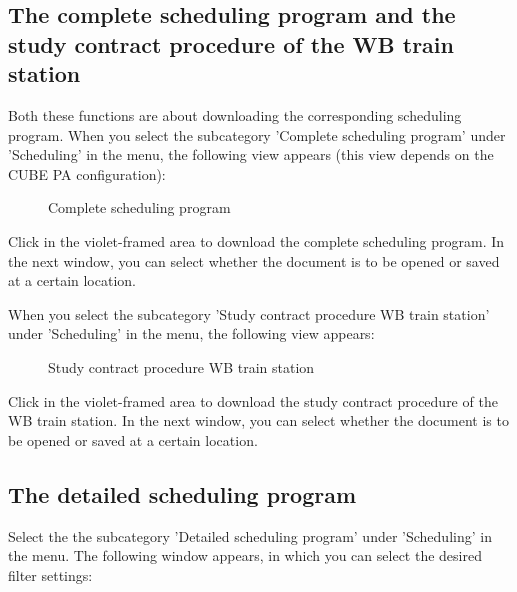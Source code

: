 \vspace{5cm} 

\subsection{The complete scheduling program and the study contract procedure of the WB train station}

Both these functions are about downloading the corresponding scheduling program.\newline
When you select the subcategory 'Complete scheduling program' under 'Scheduling' in the menu, the following view appears (this view depends on the CUBE PA configuration):
\begin{figure}[H]
\caption{Complete scheduling program}
\end{figure}

Click in the violet-framed area to download the complete scheduling program. In the next window, you can select whether the document is to be opened or saved at a certain location.

\vspace{\baselineskip}

When you select the subcategory 'Study contract procedure WB train station' under 'Scheduling' in the menu, the following view appears:

\begin{figure}[H]
\caption{Study contract procedure WB train station}
\end{figure}

Click in the violet-framed area to download the study contract procedure of the WB train station. In the next window, you can select whether the document is to be opened or saved at a certain location.

\subsection{The detailed scheduling program}

Select the the subcategory 'Detailed scheduling program' under 'Scheduling' in the menu. The following window appears, in which you can select the desired filter settings:

